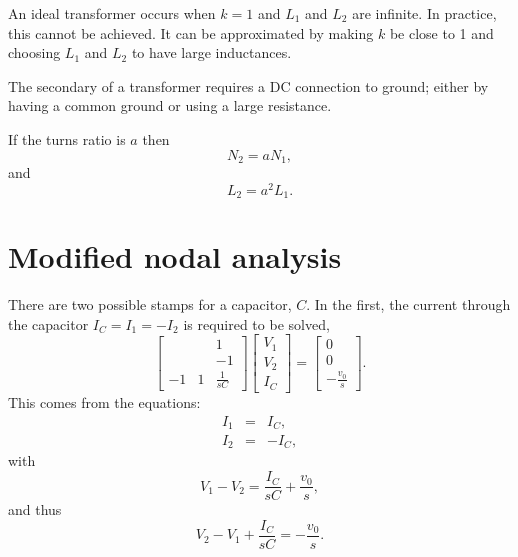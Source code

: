 \documentclass[a4paper, 12pt]{article}
\begin{document}
An ideal transformer occurs when $k=1$ and $L_1$ and $L_2$ are
infinite.  In practice, this cannot be achieved.  It can be
approximated by making $k$ be close to 1 and choosing $L_1$ and $L_2$
to have large inductances.


The secondary of a transformer requires a DC connection to ground;
either by having a common ground or using a large resistance.

If the turns ratio is $a$ then
%
\begin{equation}
N_2 = a N_1,
\end{equation}
%
and
%
\begin{equation}
  L_2 = a^2 L_1.
\end{equation}


\section{Modified nodal analysis}

There are two possible stamps for a capacitor, $C$.  In the first,
the current through the capacitor $I_C=I_1=-I_2$ is required to be solved,
%
\begin{equation}
  \begin{bmatrix}
     &  & 1 \\
     &  & -1 \\
-1 & 1 & \frac{1}{sC}
  \end{bmatrix}
  \begin{bmatrix}
    V_1 \\ V_2 \\ I_C
  \end{bmatrix}
=
\begin{bmatrix}
  0 \\ 0 \\ - \frac{v_0}{s}
\end{bmatrix}.
\end{equation}
%
This comes from the equations:
%
\begin{eqnarray}
\label{eqn:C_I1}
  I_1 & = & I_C, \\
  I_2 & = & -I_C,
\label{eqn:C_I2}
\end{eqnarray}
%
with
%
\begin{equation}
    V_1 - V_2  =  \frac{I_C}{sC} + \frac{v_0}{s},
\end{equation}
%
and thus
%
\begin{equation}
    V_2 - V_1 + \frac{I_C}{sC} =  -\frac{v_0}{s}.
\end{equation}
\end{document}
